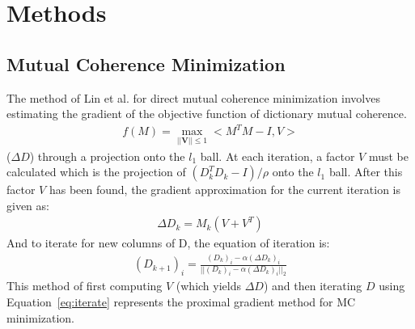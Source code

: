 \documentclass[journal]{IEEEtran}
\begin{document}
\section{Methods}
\subsection{Mutual Coherence Minimization}
The method of Lin et al. for direct mutual coherence minimization involves estimating the gradient 
of the objective function of dictionary mutual coherence.
\begin{align}
    f(M) = \max_{||\mathbf{V}|| \leq 1} <M^T M - I, V>
\end{align}
($\Delta D$) through a projection onto the $l_1$ ball. At each iteration, a factor $V$ 
must be calculated which is
the projection of $(D_k^T D_k - I)/ \rho $ onto the $l_1$ ball.
After this factor $V$ has been found, the gradient approximation for the current iteration is given as:
\begin{align}
    \Delta D_k = M_k(V + V^T)
\end{align}
And to iterate for new columns of D, the equation of iteration is:
\begin{align}
    (D_{k+1})_i = \frac{(D_k)_i - \alpha (\Delta D_k)_i}{||(D_k)_i - \alpha (\Delta D_k)_i||_2}
\label{eq:iterate}
\end{align}
This method of first computing $V$ (which yields $\Delta D$) and then iterating $D$ using
Equation~\ref{eq:iterate} represents the proximal gradient method for MC minimization.
\end{document}
